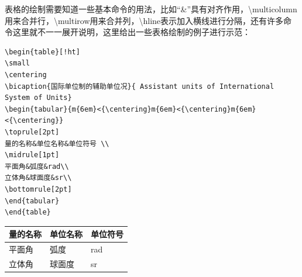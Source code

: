 表格的绘制需要知道一些基本命令的用法，比如“\&”具有对齐作用，\textbackslash multicolumn用来合并行，\textbackslash multirow用来合并列，\textbackslash hline表示加入横线进行分隔，还有许多命令这里就不一一展开说明，这里给出一些表格绘制的例子进行示范：
\begin{lstlisting}[caption={表3.2绘制代码}]
\begin{table}[!ht]
\small
\centering
\bicaption{国际单位制的辅助单位况}{ Assistant units of International System of Units} 
\begin{tabular}{m{6em}<{\centering}m{6em}<{\centering}m{6em}<{\centering}}
\toprule[2pt]
量的名称&单位名称&单位符号 \\
\midrule[1pt]
平面角&弧度&rad\\
立体角&球面度&sr\\
\bottomrule[2pt]
\end{tabular}
\end{table}
\end{lstlisting}
\begin{table}[!ht]
	\small
	\centering
	\begin{tabular}{m{6em}<{\centering}m{6em}<{\centering}m{6em}<{\centering}}
		\toprule[2pt]
		量的名称&单位名称&单位符号 \\
		\midrule[1pt]
		平面角&弧度&rad\\
		立体角&球面度&sr\\
		\bottomrule[2pt]
	\end{tabular}
\end{table}
